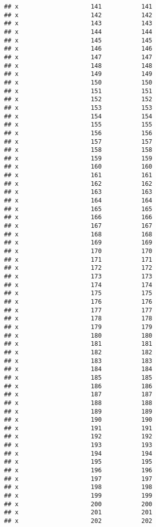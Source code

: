 \documentclass[
]{article}
\begin{document}
\begin{verbatim}
## x                    141           141
## x                    142           142
## x                    143           143
## x                    144           144
## x                    145           145
## x                    146           146
## x                    147           147
## x                    148           148
## x                    149           149
## x                    150           150
## x                    151           151
## x                    152           152
## x                    153           153
## x                    154           154
## x                    155           155
## x                    156           156
## x                    157           157
## x                    158           158
## x                    159           159
## x                    160           160
## x                    161           161
## x                    162           162
## x                    163           163
## x                    164           164
## x                    165           165
## x                    166           166
## x                    167           167
## x                    168           168
## x                    169           169
## x                    170           170
## x                    171           171
## x                    172           172
## x                    173           173
## x                    174           174
## x                    175           175
## x                    176           176
## x                    177           177
## x                    178           178
## x                    179           179
## x                    180           180
## x                    181           181
## x                    182           182
## x                    183           183
## x                    184           184
## x                    185           185
## x                    186           186
## x                    187           187
## x                    188           188
## x                    189           189
## x                    190           190
## x                    191           191
## x                    192           192
## x                    193           193
## x                    194           194
## x                    195           195
## x                    196           196
## x                    197           197
## x                    198           198
## x                    199           199
## x                    200           200
## x                    201           201
## x                    202           202

\end{verbatim}
\end{document}
